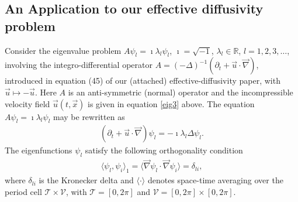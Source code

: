 \documentclass{article}
\newcommand{\Tc}{\mathcal{T}}
\newcommand{\Vc}{\mathcal{V}}
\newcommand{\0}{\mathbf{0}}
\newcommand{\1}{\mathbf{1}}
\newcommand{\2}{\mathbf{2}}
\newcommand{\3}{\mathbf{3}}
\newcommand{\4}{\mathbf{4}}
\newcommand{\5}{\mathbf{5}}
\newcommand{\6}{\mathbf{6}}
\newcommand{\7}{\mathbf{7}}
\newcommand{\8}{\mathbf{8}}
\begin{document}
\subsection{An Application to our effective diffusivity problem}
%
Consider the eigenvalue problem $A\psi_l=\imath\lambda_l\psi_l$, $\imath=\sqrt{-1}$,
$\lambda_l\in\mathbb{R}$, $l=1,2,3,\ldots$, involving the integro-differential operator
$A=(-\Delta)^{-1}(\partial_t+\vec{u}\cdot\vec{\nabla})$,  
introduced in equation (45) of our (attached) effective-diffusivity
paper, with $\vec{u}\mapsto-\vec{u}$. Here $A$ is an anti-symmetric (normal)
operator and the incompressible velocity field
$\vec{u}(t,\vec{x})$
is given in equation \eqref{eig3} above. The equation $A\psi_l=\imath\lambda_l\psi_l$ may be
rewritten as     
%
\begin{align}\label{eq:Eig_prob}
  (\partial_t+\vec{u}\cdot\vec{\nabla})\psi_l=-\imath\lambda_l\Delta\psi_l.
\end{align}
%
The eigenfunctions $\psi_l$ satisfy the following orthogonality condition
%
\begin{align}\label{eq:Orthogonal}
  \langle\psi_l,\psi_i\rangle_1=\langle\vec{\nabla}\psi_l\cdot\vec{\nabla}\psi_i\rangle=\delta_{li},
\end{align}
%
where $\delta_{li}$ is the Kronecker delta and $\langle\cdot\rangle$ denotes space-time
averaging over the period cell $\Tc\times\Vc$, with $\Tc=[0,2\pi]$ and
$\Vc=[0,2\pi]\times[0,2\pi]$.
\end{document}
